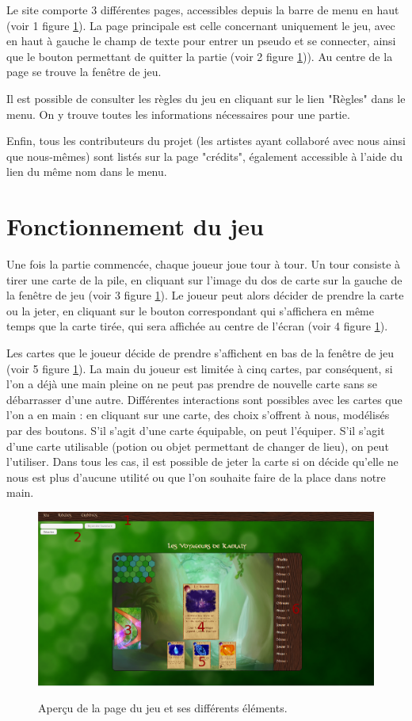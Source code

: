 \documentclass[12pt]{report}
\begin{document}
    Le site comporte 3 différentes pages, accessibles depuis la barre de menu en haut (voir 1 figure \ref{fig:manual}). La page principale est celle concernant uniquement le jeu, avec en haut à gauche le champ de texte pour entrer un pseudo et se connecter, ainsi que le bouton permettant de quitter la partie (voir 2 figure \ref{fig:manual})). Au centre de la page se trouve la fenêtre de jeu.

    Il est possible de consulter les règles du jeu en cliquant sur le lien "Règles" dans le menu. On y trouve toutes les informations nécessaires pour une partie.

    Enfin, tous les contributeurs du projet (les artistes ayant collaboré avec nous ainsi que nous-mêmes) sont listés sur la page "crédits", également accessible à l'aide du lien du même nom dans le menu.

    \section{Fonctionnement du jeu}

    Une fois la partie commencée, chaque joueur joue tour à tour. Un tour consiste à tirer une carte de la pile, en cliquant sur l'image du dos de carte sur la gauche de la fenêtre de jeu (voir 3 figure \ref{fig:manual}). Le joueur peut alors décider de prendre la carte ou la jeter, en cliquant sur le bouton correspondant qui s'affichera en même temps que la carte tirée, qui sera affichée au centre de l'écran (voir 4 figure \ref{fig:manual}).

    Les cartes que le joueur décide de prendre s'affichent en bas de la fenêtre de jeu (voir 5 figure \ref{fig:manual}). La main du joueur est limitée à cinq cartes, par conséquent, si l'on a déjà une main pleine on ne peut pas prendre de nouvelle carte sans se débarrasser d'une autre. Différentes interactions sont possibles avec les cartes que l'on a en main : en cliquant sur une carte, des choix s'offrent à nous, modélisés par des boutons. S'il s'agit d'une carte équipable, on peut l'équiper. S'il s'agit d'une carte utilisable (potion ou objet permettant de changer de lieu), on peut l'utiliser. Dans tous les cas, il est possible de jeter la carte si on décide qu'elle ne nous est plus d'aucune utilité ou que l'on souhaite faire de la place dans notre main.

	\begin{figure}[h!]
		\centering
		\includegraphics[scale=0.35]{manual}
		\label{fig:manual}
		\caption{Aperçu de la page du jeu et ses différents éléments.}
	\end{figure}
\end{document}
